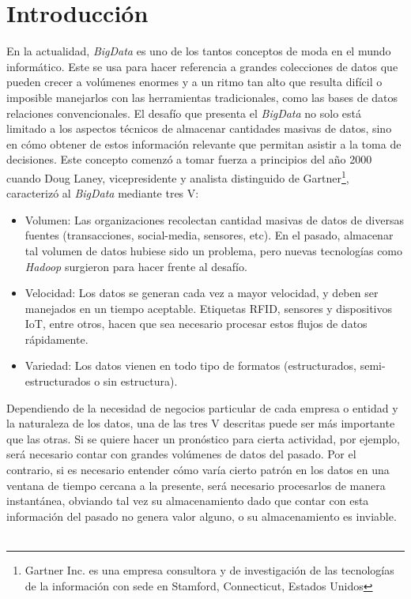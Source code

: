 \documentclass[a4paper,10pt, oneside]{article}
\begin{document}
\section{Introducción}
En la actualidad, \textit{BigData} es uno de los tantos conceptos de moda en el mundo informático. Este se usa para hacer referencia a grandes colecciones de datos que pueden crecer a volúmenes enormes y a un ritmo tan alto que resulta difícil o imposible manejarlos con las herramientas tradicionales, como las bases de datos relaciones convencionales. El desafío que presenta el \textit{BigData} no solo está limitado a los aspectos técnicos de almacenar cantidades masivas de datos, sino en cómo obtener de estos información relevante que permitan asistir a la toma de decisiones.
Este concepto comenzó a tomar fuerza a principios del año 2000 cuando Doug Laney, vicepresidente y analista distinguido de Gartner\footnote{Gartner Inc. es una empresa consultora y de investigación de las tecnologías de la información con sede en Stamford, Connecticut, Estados Unidos}, caracterizó al \textit{BigData} mediante tres V:
\begin{itemize}
	\item Volumen: Las organizaciones recolectan cantidad masivas de datos de diversas fuentes (transacciones, social-media, sensores, etc). En el pasado, almacenar tal volumen de datos hubiese sido un problema, pero nuevas tecnologías como \textit{Hadoop} surgieron para hacer frente al desafío.
	\item Velocidad: Los datos se generan cada vez a mayor velocidad, y deben ser manejados en un tiempo aceptable. Etiquetas RFID, sensores y dispositivos IoT, entre otros, hacen que sea necesario procesar estos flujos de datos rápidamente.
	\item Variedad: Los datos vienen en todo tipo de formatos (estructurados, semi-estructurados o sin estructura).
\end{itemize}

Dependiendo de la necesidad de negocios particular de cada empresa o entidad y la naturaleza de los datos, una de las tres V descritas puede ser más importante que las otras. Si se quiere hacer un pronóstico para cierta actividad, por ejemplo, será necesario contar con grandes volúmenes de datos del pasado. Por el contrario, si es necesario entender cómo varía cierto patrón en los datos en una ventana de tiempo cercana a la presente, será necesario procesarlos de manera instantánea, obviando tal vez su almacenamiento dado que contar con esta información del pasado no genera valor alguno, o su almacenamiento es inviable.
\
\end{document}
